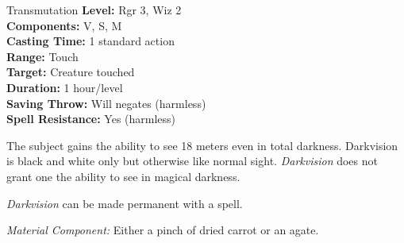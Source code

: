 {Transmutation}
{
	\textbf{Level:}
	Rgr 3, Wiz 2\\
	\textbf{Components:}
	V, S, M\\
	\textbf{Casting Time:}
	1 standard action\\
	\textbf{Range:}
	Touch\\
	\textbf{Target:}
	Creature touched\\
	\textbf{Duration:}
	1 hour/level\\
	\textbf{Saving Throw:}
	Will negates (harmless)\\
	\textbf{Spell Resistance:}
	Yes (harmless)\\
}
{
	The subject gains the ability to see 18 meters even in total darkness. Darkvision is black and white only but otherwise like normal sight. \emph{Darkvision} does not grant one the ability to see in magical darkness.

	\emph{Darkvision} can be made permanent with a  spell.

	\textit{Material Component:}
	Either a pinch of dried carrot or an agate.

}
